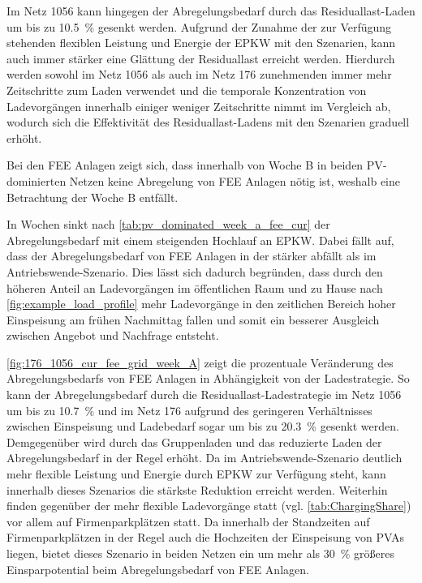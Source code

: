 Im Netz \num{1056} kann hingegen der Abregelungsbedarf durch das Residuallast-Laden um bis zu \SI{10.5}{\percent} gesenkt werden.
Aufgrund der Zunahme der zur Verfügung stehenden flexiblen Leistung und Energie der \gls{EPKW} mit den Szenarien, kann auch immer stärker eine Glättung der Residuallast erreicht werden.
Hierdurch werden sowohl im Netz \num{1056} als auch im Netz \num{176} zunehmenden immer mehr Zeitschritte zum Laden verwendet und die temporale Konzentration von Ladevorgängen innerhalb einiger weniger Zeitschritte nimmt im Vergleich ab, wodurch sich die Effektivität des Residuallast-Ladens mit den Szenarien graduell erhöht.




Bei den \gls{FEE} Anlagen zeigt sich, dass innerhalb von Woche B in beiden \gls{PV}-dominierten Netzen keine Abregelung von \gls{FEE} Anlagen nötig ist, weshalb eine Betrachtung der Woche B entfällt.

In Wochen sinkt nach \autoref{tab:pv_dominated_week_a_fee_cur} der Abregelungsbedarf mit einem steigenden Hochlauf an \gls{EPKW}.
Dabei fällt auf, dass der Abregelungsbedarf von \gls{FEE} Anlagen in der \SzeFirmenparkplatz stärker abfällt als im Antriebswende-Szenario.
Dies lässt sich dadurch begründen, dass durch den höheren Anteil an Ladevorgängen im öffentlichen Raum und zu Hause nach \autoref{fig:example_load_profile} mehr Ladevorgänge in den zeitlichen Bereich hoher Einspeisung am frühen Nachmittag fallen und somit ein besserer Ausgleich zwischen Angebot und Nachfrage entsteht.



\autoref{fig:176_1056_cur_fee_grid_week_A} zeigt die prozentuale Veränderung des Abregelungsbedarfs von \gls{FEE} Anlagen in Abhängigkeit von der Ladestrategie.
So kann der Abregelungsbedarf durch die Residuallast-Ladestrategie im Netz \num{1056} um bis zu \SI{10.7}{\percent} und im Netz \num{176} aufgrund des geringeren Verhältnisses zwischen Einspeisung und Ladebedarf sogar um bis zu \SI{20.3}{\percent} gesenkt werden.
Demgegenüber wird durch das Gruppenladen und das reduzierte Laden der Abregelungsbedarf in der Regel erhöht.
Da im Antriebswende-Szenario deutlich mehr flexible Leistung und Energie durch \gls{EPKW} zur Verfügung steht, kann innerhalb dieses Szenarios die stärkste Reduktion erreicht werden.
Weiterhin finden gegenüber der \SzeFirmenparkplatz mehr flexible Ladevorgänge statt (vgl. \autoref{tab:ChargingShare}) vor allem auf Firmenparkplätzen statt.
Da innerhalb der Standzeiten auf Firmenparkplätzen in der Regel auch die Hochzeiten der Einspeisung von \glspl{PVA} liegen, bietet dieses Szenario in beiden Netzen ein um mehr als \SI{30}{\percent} größeres Einsparpotential beim Abregelungsbedarf von \gls{FEE} Anlagen.

